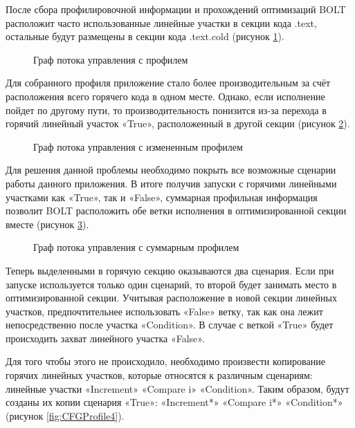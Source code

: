 После сбора профилировочной информации и прохождений оптимизаций BOLT расположит часто использованные линейные участки в секции кода .text, остальные будут размещены в секции кода .text.cold (рисунок \cref{fig:CFGProfile1}).
 
\begin{figure}[!h]
    \centerfloat{
        \texttt{[image: \_3]}
    }
    \caption{Граф потока управления с профилем}\label{fig:CFGProfile1}
\end{figure}
Для собранного профиля приложение стало более производительным за счёт расположения всего горячего кода в одном месте. Однако, если исполнение пойдет по другому пути, то производительность понизится из-за перехода в горячий линейный участок «True», расположенный в другой секции (рисунок \cref{fig:CFGProfile2}).

\begin{figure}[!h]
    \centerfloat{
        \texttt{[image: \_4]}
    }
    \caption{Граф потока управления с измененным профилем}\label{fig:CFGProfile2}
\end{figure}

Для решения данной проблемы необходимо покрыть все возможные сценарии работы данного приложения. В итоге получив запуски с горячими линейными участками как «True», так и «False», суммарная профильная информация позволит BOLT расположить обе ветки исполнения в оптимизированной секции вместе (рисунок \cref{fig:CFGProfile3})\cite{Lin2021}.
 
\begin{figure}[!h]
    \centerfloat{
        \texttt{[image: \_5]}
    }
    \caption{Граф потока управления с суммарным профилем}\label{fig:CFGProfile3}
\end{figure}
Теперь выделенными в горячую секцию оказываются два сценария. Если при запуске используется только один сценарий, то второй будет занимать место в оптимизированной секции. Учитывая расположение в новой секции линейных участков, предпочтительнее использовать «False» ветку, так как она лежит непосредственно после участка «Condition». В случае с веткой «True» будет происходить захват линейного участка «False».

Для того чтобы этого не происходило, необходимо произвести копирование горячих линейных участков, которые относятся к различным сценариям: линейные участки «Increment» «Compare i» «Condition». Таким образом, будут созданы их копии сценария «True»: «Increment*» «Compare i*» «Condition*» (рисунок \cref{fig:CFGProfile4}).
 
